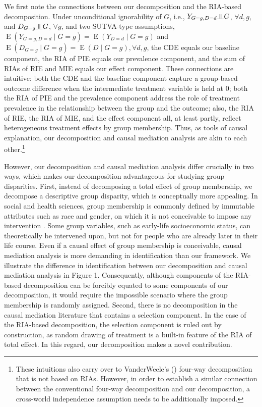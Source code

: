 \documentclass[12pt,a4paper]{article}
\newcommand{\indep}{\rotatebox[origin=c]{90}{$\models$}}  %
\newcommand{\E}{\operatorname{E}}
\begin{document}
We first note the connections between our decomposition and the RIA-based decomposition. 
Under unconditional ignorability of $G$, i.e., $Y_{G=g,D=d} \indep G$, $\forall d,g$, and $D_{G=g} \indep G$, $\forall g$, and two SUTVA-type assumptions, $\E(Y_{G=g,D=d} \mid  G=g)=\E(Y_{D=d} \mid  G=g)$ and $\E(D_{G=g} \mid  G=g)=\E(D \mid  G=g), \forall d,g$, the CDE equals our baseline component, the RIA of PIE equals our prevalence component, and the sum of RIAs of RIE and MIE equals our effect component. These connections are intuitive: both the CDE and the baseline component capture a group-based outcome difference when the intermediate treatment variable is held at $0$; both the RIA of PIE and the prevalence component address the role of treatment prevalence in the relationship between the group and the outcome; also, the RIA of RIE, the RIA of MIE, and the effect component all, at least partly, reflect heterogeneous treatment effects by group membership. Thus, as tools of causal explanation, our decomposition and causal mediation analysis are akin to each other.\footnote{These intuitions also carry over to VanderWeele's (\citeyear{vanderweele_unification_2014}) four-way decomposition that is not based on RIAs. However, in order to establish a similar connection between the conventional four-way decomposition and our decomposition, a cross-world independence assumption needs to be additionally imposed.}

However, our decomposition and causal mediation analysis differ crucially in two ways, which makes our decomposition advantageous for studying group disparities. First, instead of decomposing a total effect of group membership, we decompose a descriptive group disparity, which is conceptually more appealing. In social and health sciences, group membership is commonly defined by immutable attributes such as race and gender, on which it is not conceivable to impose any intervention \citep{rubin_estimating_1974, holland_statistics_1986, berzuini_causal_2012}. Some group variables, such as early-life socioeconomic status, can theoretically be intervened upon, but not for people who are already later in their life course. Even if a causal effect of group membership is conceivable, causal mediation analysis is more demanding in identification than our framework. We illustrate the difference in identification between our decomposition and causal mediation analysis in Figure 1. Consequently, although components of the RIA-based decomposition can be forcibly equated to some components of our decomposition, it would require the impossible scenario where the group membership is randomly assigned.
Second, there is no decomposition in the causal mediation literature that contains a selection component. In the case of the RIA-based decomposition, the selection component is ruled out by construction, as random drawing of treatment is a built-in feature of the RIA of total effect. In this regard, our decomposition makes a novel contribution.
\end{document}
